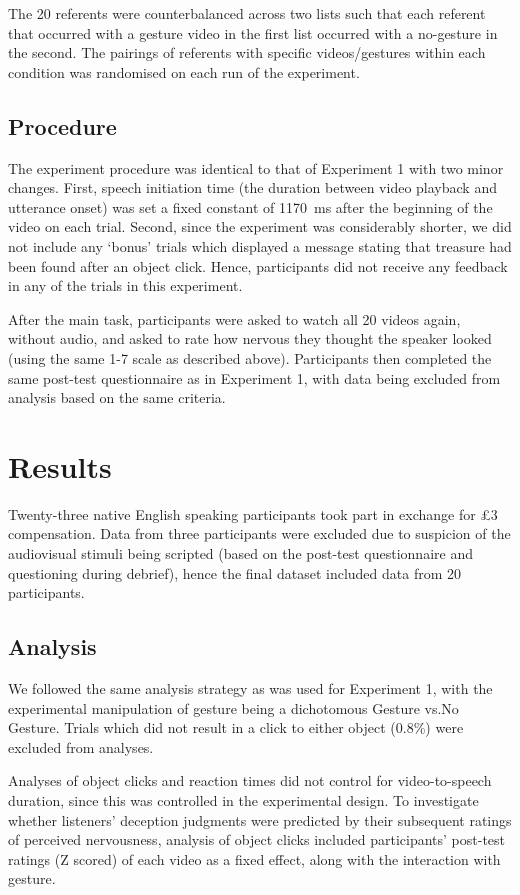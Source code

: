 \documentclass[a4paper,man,natbib]{apa6}
\begin{document}
The 20 referents were counterbalanced across two lists such that each referent that occurred with a gesture video in the first list occurred with a no-gesture in the second.
The pairings of referents with specific videos/gestures within each condition was randomised on each run of the experiment.

\subsection{Procedure}
The experiment procedure was identical to that of Experiment 1 with two minor changes.
First, speech initiation time (the duration between video playback and utterance onset) was set a fixed constant of 1170~ms after the beginning of the video on each trial.
Second, since the experiment was considerably shorter, we did not include any `bonus' trials which displayed a message stating that treasure had been found after an object click.
Hence, participants did not receive any feedback in any of the trials in this experiment.

After the main task, participants were asked to watch all 20 videos again, without audio, and asked to rate how nervous they thought the speaker looked (using the same 1-7 scale as described above).
Participants then completed the same post-test questionnaire as in Experiment 1, with data being excluded from analysis based on the same criteria.

\section{Results}
Twenty-three native English speaking participants took part in exchange for \pounds{}3 compensation. 
Data from three participants were excluded due to suspicion of the audiovisual stimuli being scripted (based on the post-test questionnaire and questioning during debrief), hence the final dataset included data from 20 participants.

\subsection{Analysis}
We followed the same analysis strategy as was used for Experiment 1, with the experimental manipulation of gesture being a dichotomous Gesture vs.\@ No Gesture.
Trials which did not result in a click to either object (0.8\%) were excluded from analyses.

Analyses of object clicks and reaction times did not control for video-to-speech duration, since this was controlled in the experimental design.
To investigate whether listeners' deception judgments were predicted by their subsequent ratings of perceived nervousness, analysis of object clicks included participants' post-test ratings (Z scored) of each video as a fixed effect, along with the interaction with gesture.
\end{document}
